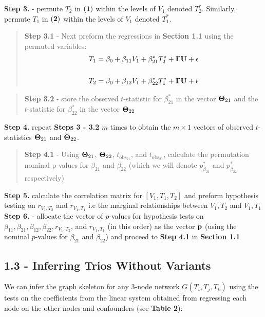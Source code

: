 \documentclass[12pt]{report}
\begin{document}
\noindent \textbf{Step 3.} - permute $T_2$ in $\bf (1)$ within the levels of $V_1$ denoted $T_2^{\ast}$. Similarly, permute $T_1$ in $\bf (2)$ within the levels of $V_1$ denoted $T_1^{\ast}$. 
\begin{quote}
\textbf{Step 3.1} - Next preform the regressions in \textbf{Section 1.1} using the permuted variables:
\begin{eqnarray}
T_1 = \beta_0 +\beta_{11}V_1+\beta_{21}^{\ast}T_2^{\ast}+{\bf \Gamma U}+ \epsilon \\
\nonumber\\
T_2 = \beta_0 +\beta_{12}V_1+\beta_{22}^{\ast}T_1^{\ast}+{\bf \Gamma U}+ \epsilon 
\end{eqnarray}
\end{quote}

\begin{quote}
\textbf{Step 3.2} - store the observed $t$-statistic for $\beta_{21}^{\ast}$ in the vector ${\bf \Theta}_{21}$ and the $t$-statistic for $\beta_{22}^{\ast}$ in the vector ${\bf \Theta}_{22}$
\end{quote}

\noindent \textbf{Step 4.} repeat \textbf{Steps 3 - 3.2} $m$ times to obtain the $m \times 1$ vectors of observed $t$-statistics ${\bf \Theta}_{21}$ and ${\bf \Theta}_{22}$. \\

\begin{quote}
\textbf{Step 4.1} - Using ${\bf \Theta}_{21}$, ${\bf \Theta}_{22}$, $t_{\text{obs}_{21}}$, and $t_{\text{obs}_{21}}$, calculate the permutation nominal p-values for $\beta_{21}$ and $\beta_{22}$ (which we will denote $p_{\beta_{21}}^{\ast}$ and $p_{\beta_{22}}^{\ast}$ respectively)
\end{quote}

\noindent \textbf{Step 5.} calculate the correlation matrix for $[V_1, T_1, T_2]$ and preform hypothesis testing on $r_{V_1,T_2}$ and $r_{V_1, T_1}$ i.e the marginal relationships between $V_1,T_2$ and $V_1, T_1$ \\

\noindent \textbf{Step 6.} - allocate the vector of $p$-values for hypothesis tests on $\beta_{11}, \beta_{21}, \beta_{12}, \beta_{22}, r_{V_1,T_2}$, and $r_{V_1, T_1}$ (in this order) as the vector $\bf {p}$ (using the nominal $p$-values for $\beta_{21}$ and $\beta_{22}$) and proceed to \textbf{Step 4.1} in \textbf{Section 1.1} \\


\subsection*{1.3 - Inferring Trios Without Variants} 
We can infer the graph skeleton for any 3-node network $G(T_i, T_j, T_k)$ using the tests on the coefficients from the linear system obtained from regressing each node on the other nodes and confounders (see \textbf{Table 2}):
\end{document}
